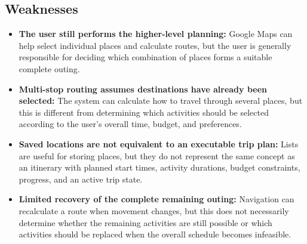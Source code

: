 \subsection{Weaknesses}

\begin{itemize}
\item \textbf{The user still performs the higher-level planning:} Google Maps can help select individual places and calculate routes, but the user is generally responsible for deciding which combination of places forms a suitable complete outing.
\item \textbf{Multi-stop routing assumes destinations have already been selected:} The system can calculate how to travel through several places, but this is different from determining which activities should be selected according to the user's overall time, budget, and preferences.
\item \textbf{Saved locations are not equivalent to an executable trip plan:} Lists are useful for storing places, but they do not represent the same concept as an itinerary with planned start times, activity durations, budget constraints, progress, and an active trip state.
\item \textbf{Limited recovery of the complete remaining outing:} Navigation can recalculate a route when movement changes, but this does not necessarily determine whether the remaining activities are still possible or which activities should be replaced when the overall schedule becomes infeasible.
\end{itemize}


